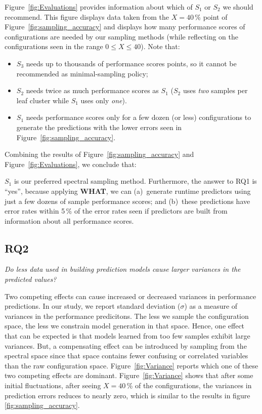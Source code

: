 \documentclass[smallextended]{svjour3}       %
\newcommand{\fig}[1]{Figure~\ref{fig:#1}}
\newcommand{\what}{{\bf WHAT}\xspace}
\begin{document}
\fig{Evaluations} provides information about which  of    $S_1$ or $S_2$ we should recommend.
This figure displays data taken from the $X=40$\,\% point of \fig{sampling_accuracy} and displays
how many performance scores of configurations are needed by our sampling methods (while
reflecting on the configurations seen in the range $0\le X \le 40$). Note that:
\begin{itemize}
\item
$S_3$ needs up to thousands of performance scores points, 
so it cannot be recommended as minimal-sampling policy;
\item $S_2$ needs twice as much performance scores as 
$S_1$ ($S_2$ uses {\em two} samples per leaf cluster  while
$S_1$ uses only {\em one}).
\item $S_1$ needs performance scores only for a few dozen (or less) configurations to generate
the predictions with the lower errors seen in \fig{sampling_accuracy}.
\end{itemize}
Combining the results of \fig{sampling_accuracy} and \fig{Evaluations}, we conclude that:

\begin{myshadowbox}
$S_1$ is our preferred spectral sampling method. Furthermore,
the answer to RQ1 is ``yes'', because applying \what{}, we can (a)~generate runtime predictors
using just a few dozens of sample performance scores; 
and (b)~these predictions have error rates
within 5\,\% of the error rates seen if predictors are built from information about all performance scores.
\end{myshadowbox}




\subsection{RQ2}

\begin{center}
{\em
Do less data used in building prediction models cause larger variances in the predicted values?}
\end{center}


Two competing effects can cause increased or decreased  variances in 
performance predictions. In our study, we report standard deviation ($\sigma$) as a measure of variances in the performance predicitons.
The   less we sample the configuration space,
the less we constrain model generation in that space. Hence, one effect that can be expected
is that models learned
from too few samples exhibit large variances. 
But,
a  compensating effect can be introduced by sampling from the spectral space
since that space contains fewer confusing or correlated variables than the raw configuration space.
\fig{Variance} reports which one of these two competing effects are dominant. 
\fig{Variance} shows that after some initial fluctuations,
after seeing $X=40$\,\% of the configurations, the variances in prediction errors reduces to nearly zero, which is similar to the results in figure \ref{fig:sampling_accuracy}.
\end{document}
